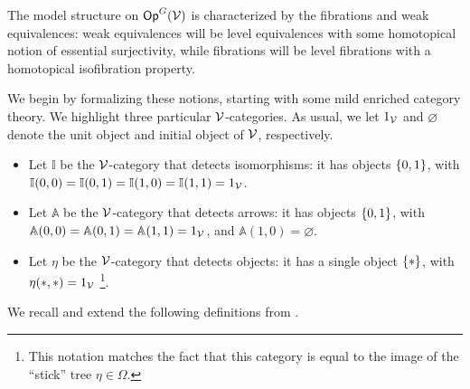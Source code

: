 \documentclass[a4paper,10pt
,draft
]{article}%
\newcommand{\I}{\mathbb I}
\renewcommand{\1}{\eta}%
\begin{document}



The model structure on $\mathsf{Op}^G(\mathcal V)$ is characterized by the fibrations and weak equivalences:
weak equivalences will be level equivalences with some homotopical notion of essential surjectivity,
while fibrations will be level fibrations with a homotopical isofibration property.

We begin by formalizing these notions, starting with some mild enriched category theory.
We highlight three particular $\mathcal V$-categories.
As usual, we let $1_{\mathcal V}$ and $\varnothing$ denote the unit object and initial object of $\mathcal V$, respectively.
\begin{itemize} %
\item Let $\I$ be the $\mathcal V$-category that detects isomorphisms: it has objects $\left\{0,1\right\}$,
      with $\I(0,0) = \I(0,1) = \I(1,0) = \I(1,1) = 1_\V$.
\item Let $\mathbb A$ be the $\mathcal V$-category that detects arrows: it has objects $\left\{0,1\right\}$,
      with $\mathbb A(0,0) = \mathbb A(0,1) = \mathbb A(1,1) = 1_{\mathcal V}$, and $\mathbb A(1,0) = \varnothing$.
\item Let $\1$ be the $\mathcal V$-category that detects objects: it has a single object $\set{\**}$, with $\1(\**, \**) = 1_\V$
      \footnote{
        This notation matches the fact that this category is equal to the image of the ``stick'' tree $\eta \in \Omega$.}.
\end{itemize}

We recall and extend the following definitions from \cite{BM13}. 
\end{document}
